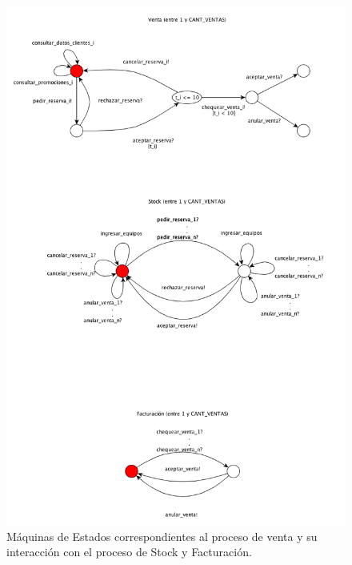 \begin{figure}[h!]
  \centering
  \includegraphics[width=1\textwidth]{./imagenes/maquina_de_estado.png}
  \caption{Máquinas de Estados correspondientes al proceso de venta y su interacción con el proceso de Stock y Facturación.}
  \label{fig:maq_estado}
\end{figure}



\clearpage
